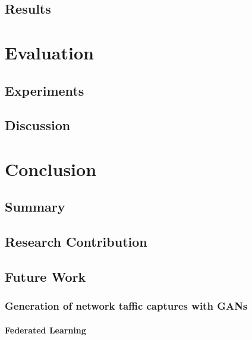 \documentclass[
	ngerman,
	ruledheaders=section,%
	class=report,%
	thesis={type=bachelor},%
	accentcolor=9c,%
	custommargins=true,%
	marginpar=false,%
	parskip=half-,%
	fontsize=11pt,%
]{tudapub}
\begin{document}
\section{Results}

\chapter{Evaluation}

\section{Experiments}

\section{Discussion}

\chapter{Conclusion}


\section{Summary}

\section{Research Contribution}

\section{Future Work}

\subsection{Generation of network taffic captures with GANs}

\subsubsection{Federated Learning}

\printbibliography
\end{document}
